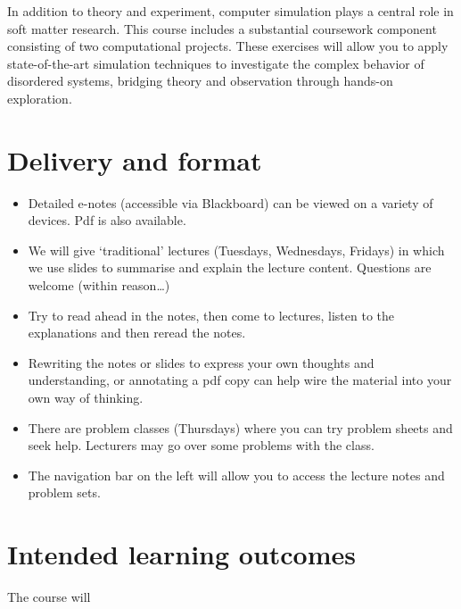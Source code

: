 \documentclass[
  letterpaper,
  enabledeprecatedfontcommands]{report}
\begin{document}
In addition to theory and experiment, computer simulation plays a
central role in soft matter research. This course includes a substantial
coursework component consisting of two computational projects. These
exercises will allow you to apply state-of-the-art simulation techniques
to investigate the complex behavior of disordered systems, bridging
theory and observation through hands-on exploration.

\section*{Delivery and format}\label{delivery-and-format}


\begin{itemize}
\item
  Detailed e-notes (accessible via Blackboard) can be viewed on a
  variety of devices. Pdf is also available.
\item
  We will give `traditional' lectures (Tuesdays, Wednesdays, Fridays) in
  which we use slides to summarise and explain the lecture content.
  Questions are welcome (within reason\ldots)
\item
  Try to read ahead in the notes, then come to lectures, listen to the
  explanations and then reread the notes.
\item
  Rewriting the notes or slides to express your own thoughts and
  understanding, or annotating a pdf copy can help wire the material
  into your own way of thinking.
\item
  There are problem classes (Thursdays) where you can try problem sheets
  and seek help. Lecturers may go over some problems with the class.
\item
  The navigation bar on the left will allow you to access the lecture
  notes and problem sets.
\end{itemize}

\section*{Intended learning outcomes}\label{intended-learning-outcomes}


The course will
\end{document}

